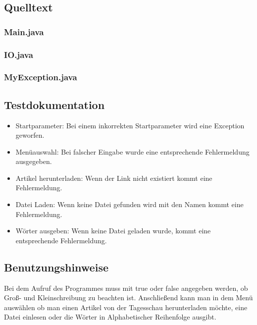 \subsection{Quelltext}
\subsubsection{Main.java}

\subsubsection{IO.java}

\subsubsection{MyException.java}


\subsection{Testdokumentation}
\begin{itemize}
	\item Startparameter:
	\subitem Bei einem inkorrekten Startparameter wird eine Exception geworfen.
	\item Menüauswahl:
	\subitem Bei falscher Eingabe wurde eine entsprechende Fehlermeldung ausgegeben.
	\item Artikel herunterladen:
	\subitem Wenn der Link nicht existiert kommt eine Fehlermeldung.
	\item Datei Laden:
	\subitem Wenn keine Datei gefunden wird mit den Namen kommt eine Fehlermeldung.
	\item Wörter ausgeben:
	\subitem Wenn keine Datei geladen wurde, kommt eine entsprechende Fehlermeldung.
\end{itemize}

\subsection{Benutzungshinweise}
Bei dem Aufruf des Programmes muss mit true oder false angegeben werden, ob Gro\ss - und
Kleinschreibung zu beachten ist. Anschlie\ss end kann man in dem Menü auswählen ob man einen
Artikel von der Tagesschau herunterladen möchte, eine Datei einlesen oder die Wörter in 
Alphabetischer Reihenfolge ausgibt.

